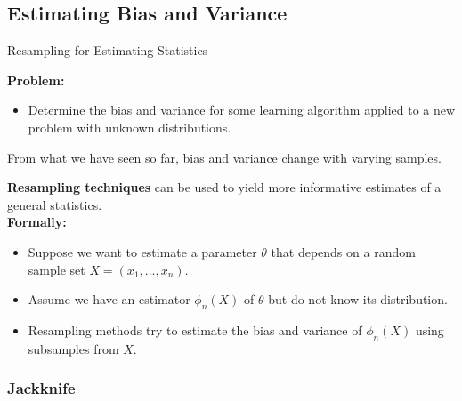 \subsection{Estimating Bias and Variance}
Resampling for Estimating Statistics

 \textbf  {Problem:}
    \begin{itemize}
    \item Determine the bias and variance for some learning algorithm applied to a new problem with unknown distributions.
  \end{itemize}
   From what we have seen so far, bias and variance change with varying samples.
         

 \textbf {Resampling techniques} can be used to yield more informative estimates of a general statistics.\\
 \textbf  {Formally:}
 \begin{itemize}
    \item Suppose we want to estimate a parameter $\theta$ that depends on a random sample set $X = (x_1, \ldots, x_n)$.
    \item Assume we have an estimator $\phi_n(X)$ of $\theta$ but do not know its distribution.
   \item Resampling methods try to estimate the bias and variance of $\phi_n(X)$ using subsamples from $X$.
  \end{itemize}
  
\subsubsection{Jackknife}
  
